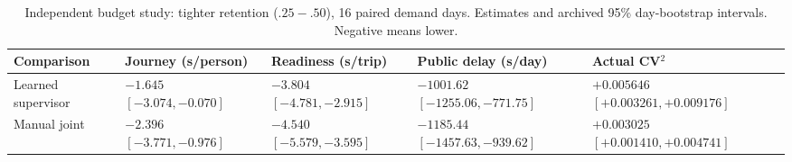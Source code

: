 \begin{table}[t]
\centering
\footnotesize
\caption{Independent budget study: tighter retention ($.25-.50$), 16 paired demand days. Estimates and archived 95\% day-bootstrap intervals. Negative means lower.}
\label{tab:budget}
\setlength{\tabcolsep}{4pt}
\begin{tabularx}{\textwidth}{@{}lYYYY@{}}
\toprule
Comparison & Journey (s/person) & Readiness (s/trip) & Public delay (s/day) & Actual CV$^2$ \\
\midrule
Learned supervisor &  &  &  &  \\[3pt]
Manual joint &  &  &  &  \\[3pt]
\bottomrule
\end{tabularx}
\end{table}
